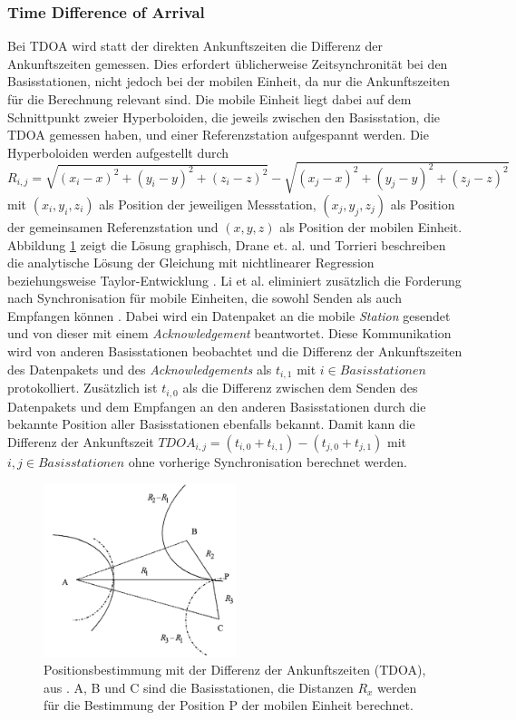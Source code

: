 \subsubsection{Time Difference of Arrival}
Bei TDOA wird statt der direkten Ankunftszeiten die Differenz der Ankunftszeiten gemessen.
Dies erfordert üblicherweise Zeitsynchronität bei den Basisstationen, nicht jedoch bei der mobilen Einheit, da nur die Ankunftszeiten für die Berechnung relevant sind.
Die mobile Einheit liegt dabei auf dem Schnittpunkt zweier Hyperboloiden, die jeweils zwischen den Basisstation, die TDOA gemessen haben, und einer Referenzstation aufgespannt werden.
Die Hyperboloiden werden aufgestellt durch
$R_{i,j} = \sqrt{(x_i - x)^2 + (y_i - y)^2 + (z_i - z)^2} - \sqrt{(x_j - x)^2 + (y_j - y)^2 + (z_j - z)^2}$ mit $(x_i,y_i,z_i)$ als Position der jeweiligen Messstation, $(x_j,y_j,z_j)$ als Position der gemeinsamen Referenzstation und $(x,y,z)$ als Position der mobilen Einheit.
Abbildung \ref{fig:tdoa} zeigt die Lösung graphisch, Drane et. al. und Torrieri beschreiben die analytische Lösung der Gleichung mit nichtlinearer Regression \cite{drane1998positioning} beziehungsweise Taylor-Entwicklung \cite{torrieri1984statistical}.
Li et al. eliminiert zusätzlich die Forderung nach Synchronisation für mobile Einheiten, die sowohl Senden als auch Empfangen können \cite{li2000comparison}.
Dabei wird ein Datenpaket an die mobile \emph{Station} gesendet und von dieser mit einem \emph{Acknowledgement} beantwortet.
Diese Kommunikation wird von anderen Basisstationen beobachtet und die Differenz der Ankunftszeiten des Datenpakets und des \emph{Acknowledgements} als $t_{i,1}$ mit $i \in Basisstationen$ protokolliert.
Zusätzlich ist $t_{i,0}$ als die Differenz zwischen dem Senden des Datenpakets und dem Empfangen an den anderen Basisstationen durch die bekannte Position aller Basisstationen ebenfalls bekannt.
Damit kann die Differenz der Ankunftszeit $TDOA_{i,j} = (t_{i,0} + t_{i,1}) - (t_{j,0} + t_{j,1})$ mit $i,j \in Basisstationen$ ohne vorherige Synchronisation berechnet werden.

\begin{figure}[h]
  \centering
	\includegraphics[width=0.5\textwidth]{images/tdoa.png}
  \caption{Positionsbestimmung mit der Differenz der Ankunftszeiten (TDOA), aus \cite{liu2007survey}. A, B und C sind die Basisstationen, die Distanzen $R_x$ werden für die Bestimmung der Position P der mobilen Einheit berechnet.}
  \label{fig:tdoa}
\end{figure}

